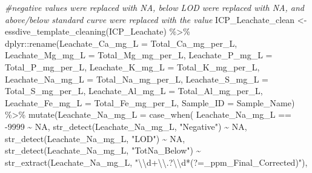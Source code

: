 \documentclass[
]{article}
\newenvironment{Shaded}{\begin{snugshade}}{\end{snugshade}}
\newcommand{\AttributeTok}[1]{\textcolor[rgb]{0.77,0.63,0.00}{#1}}
\newcommand{\CommentTok}[1]{\textcolor[rgb]{0.56,0.35,0.01}{\textit{#1}}}
\newcommand{\ConstantTok}[1]{\textcolor[rgb]{0.00,0.00,0.00}{#1}}
\newcommand{\DecValTok}[1]{\textcolor[rgb]{0.00,0.00,0.81}{#1}}
\newcommand{\FunctionTok}[1]{\textcolor[rgb]{0.00,0.00,0.00}{#1}}
\newcommand{\NormalTok}[1]{#1}
\newcommand{\OtherTok}[1]{\textcolor[rgb]{0.56,0.35,0.01}{#1}}
\newcommand{\SpecialCharTok}[1]{\textcolor[rgb]{0.00,0.00,0.00}{#1}}
\newcommand{\StringTok}[1]{\textcolor[rgb]{0.31,0.60,0.02}{#1}}
\begin{document}
\begin{Shaded}
\begin{Highlighting}[]
\CommentTok{\#negative values were replaced with NA, below LOD were replaced with NA, and above/below standard curve were replaced with the value}
\NormalTok{ICP\_Leachate\_clean }\OtherTok{\textless{}{-}} \FunctionTok{essdive\_template\_cleaning}\NormalTok{(ICP\_Leachate) }\SpecialCharTok{\%\textgreater{}\%}
\NormalTok{  dplyr}\SpecialCharTok{::}\FunctionTok{rename}\NormalTok{(}\AttributeTok{Leachate\_Ca\_mg\_L =} \StringTok{\textquotesingle{}Total\_Ca\_mg\_per\_L\textquotesingle{}}\NormalTok{,}
                \AttributeTok{Leachate\_Mg\_mg\_L =} \StringTok{\textquotesingle{}Total\_Mg\_mg\_per\_L\textquotesingle{}}\NormalTok{,}
                \AttributeTok{Leachate\_P\_mg\_L =} \StringTok{\textquotesingle{}Total\_P\_mg\_per\_L\textquotesingle{}}\NormalTok{,}
                \AttributeTok{Leachate\_K\_mg\_L =} \StringTok{\textquotesingle{}Total\_K\_mg\_per\_L\textquotesingle{}}\NormalTok{,}
                \AttributeTok{Leachate\_Na\_mg\_L =} \StringTok{\textquotesingle{}Total\_Na\_mg\_per\_L\textquotesingle{}}\NormalTok{,}
                \AttributeTok{Leachate\_S\_mg\_L =} \StringTok{\textquotesingle{}Total\_S\_mg\_per\_L\textquotesingle{}}\NormalTok{,}
                \AttributeTok{Leachate\_Al\_mg\_L =} \StringTok{\textquotesingle{}Total\_Al\_mg\_per\_L\textquotesingle{}}\NormalTok{,}
                \AttributeTok{Leachate\_Fe\_mg\_L =} \StringTok{\textquotesingle{}Total\_Fe\_mg\_per\_L\textquotesingle{}}\NormalTok{,}
                \AttributeTok{Sample\_ID =} \StringTok{\textquotesingle{}Sample\_Name\textquotesingle{}}\NormalTok{) }\SpecialCharTok{\%\textgreater{}\%}
  \FunctionTok{mutate}\NormalTok{(}\AttributeTok{Leachate\_Na\_mg\_L =} \FunctionTok{case\_when}\NormalTok{(}
\NormalTok{                Leachate\_Na\_mg\_L }\SpecialCharTok{==} \SpecialCharTok{{-}}\DecValTok{9999} \SpecialCharTok{\textasciitilde{}} \ConstantTok{NA}\NormalTok{,}
                \FunctionTok{str\_detect}\NormalTok{(Leachate\_Na\_mg\_L, }\StringTok{"Negative"}\NormalTok{) }\SpecialCharTok{\textasciitilde{}} \ConstantTok{NA}\NormalTok{, }
                \FunctionTok{str\_detect}\NormalTok{(Leachate\_Na\_mg\_L, }\StringTok{"LOD"}\NormalTok{) }\SpecialCharTok{\textasciitilde{}} \ConstantTok{NA}\NormalTok{, }
                \FunctionTok{str\_detect}\NormalTok{(Leachate\_Na\_mg\_L, }\StringTok{"TotNa\_Below"}\NormalTok{) }\SpecialCharTok{\textasciitilde{}} 
                \FunctionTok{str\_extract}\NormalTok{(Leachate\_Na\_mg\_L, }\StringTok{"}\SpecialCharTok{\textbackslash{}\textbackslash{}}\StringTok{d+}\SpecialCharTok{\textbackslash{}\textbackslash{}}\StringTok{.?}\SpecialCharTok{\textbackslash{}\textbackslash{}}\StringTok{d*(?=\_ppm\_Final\_Corrected)"}\NormalTok{),}

\end{Highlighting}
\end{Shaded}
\end{document}
